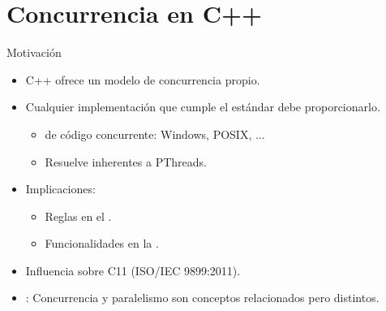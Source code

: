 \section{Concurrencia en C++}

\begin{frame}[t]{Motivación}
\begin{itemize}
  \item C++ ofrece un modelo de concurrencia propio.

  \item Cualquier implementación que cumple el estándar debe proporcionarlo.
    \begin{itemize}
      \item {} de código concurrente: Windows, POSIX, ...
      \item Resuelve  inherentes a PThreads.
    \end{itemize}

  \item Implicaciones:
    \begin{itemize}
      \item Reglas en el .
      \item Funcionalidades en la .
    \end{itemize}

  \item Influencia sobre C11 (ISO/IEC 9899:2011).

  \item {}: Concurrencia y paralelismo son conceptos relacionados pero distintos.
\end{itemize}
\end{frame}

